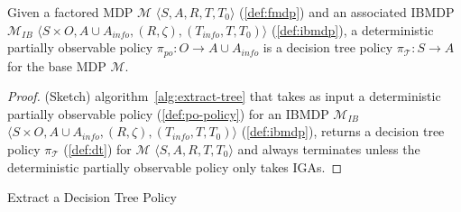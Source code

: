 \begin{proposition}\label{def:po-policy}
    Given a factored MDP $\mathcal{M}$ $\langle S, A, R, T, T_0\rangle$ (\ref{def:fmdp}) and an associated IBMDP $\mathcal{M}_{IB}$ $\langle S \times O,A \cup A_{info}, (R, \zeta), (T_{info}, T, T_0)\rangle$ (\ref{def:ibmdp}), a deterministic partially observable policy $\pi_{po}: O \rightarrow A\cup A_{info}$ is a decision tree policy $\pi_{\mathcal{T}}: S \rightarrow A$ for the base MDP $\mathcal{M}$.
\end{proposition}

\begin{proof}(Sketch) algorithm~\ref{alg:extract-tree} that takes as input a deterministic partially observable policy (\ref{def:po-policy}) for an IBMDP $\mathcal{M}_{IB}$ $\langle S \times O,A \cup A_{info}, (R, \zeta), (T_{info}, T, T_0)\rangle$ (\ref{def:ibmdp}), returns a decision tree policy $\pi_{\mathcal{T}}$ (\ref{def:dt}) for $\mathcal{M}$ $\langle S, A, R, T, T_0\rangle$ and always terminates unless the deterministic partially observable policy only takes IGAs.
\end{proof}

\begin{algorithm}[t]
    
    
    \caption{Extract a Decision Tree Policy}\label{alg:extract-tree}
\end{algorithm}

